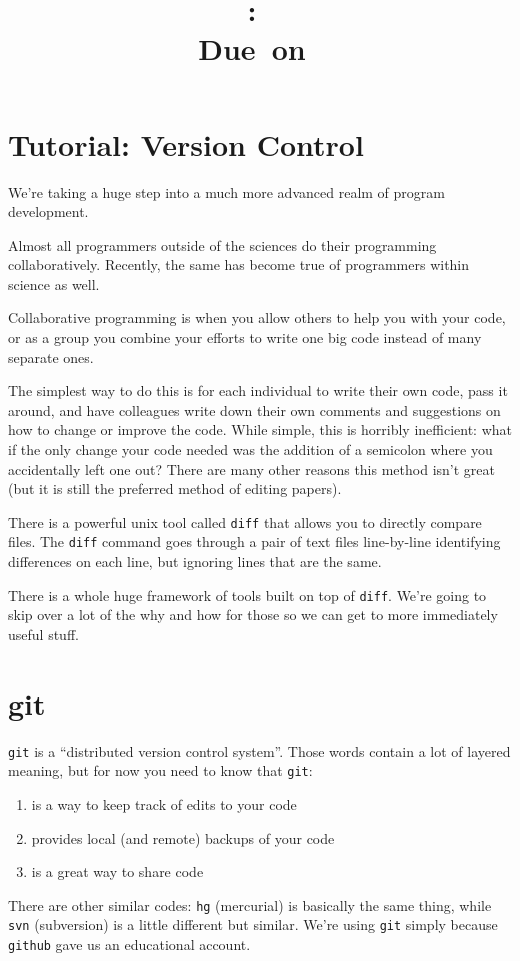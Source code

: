 \documentclass{article}
\title{\vspace{2in}\textmd{\textbf{\hmwkClass:\ \hmwkTitle}}\\\normalsize\vspace{0.1in}\small{Due\ on\ \hmwkDueDate}\\\vspace{0.1in}\large{}\vspace{3in}}
\date{}
\begin{document}
\begin{spacing}{1.0}
\newpage



\section{Tutorial: Version Control}

We're taking a huge step into a much more advanced realm of program
development.

Almost all programmers outside of the sciences do their programming
collaboratively.  Recently, the same has become true of programmers within
science as well.

Collaborative programming is when you allow others to help you with your code,
or as a group you combine your efforts to write one big code instead of many
separate ones.

The simplest way to do this is for each individual to write their own code,
pass it around, and have colleagues write down their own comments and
suggestions on how to change or improve the code.  While simple, this is
horribly inefficient: what if the only change your code needed was the addition
of a semicolon where you accidentally left one out?  There are many other
reasons this method isn't great (but it is still the preferred method of editing
papers).

There is a powerful unix tool called \texttt{diff} that allows you to directly
compare files.  The \texttt{diff} command goes through a pair of text files
line-by-line identifying differences on each line, but ignoring lines that are
the same.

There is a whole huge framework of tools built on top of \texttt{diff}.  We're
going to skip over a lot of the why and how for those so we can get to more
immediately useful stuff.

\section{git}
\texttt{git} is a ``distributed version control system''.  Those words contain a
lot of layered meaning, but for now you need to know that \texttt{git}:
\begin{enumerate}
    \item is a way to keep track of edits to your code
    \item provides local (and remote) backups of your code
    \item is a great way to share code
\end{enumerate}
There are other similar codes: \texttt{hg} (mercurial) is basically the same
thing, while \texttt{svn} (subversion) is a little different but similar.
We're using \texttt{git} simply because \texttt{github} gave us an educational
account.


\end{spacing}
\end{document}
